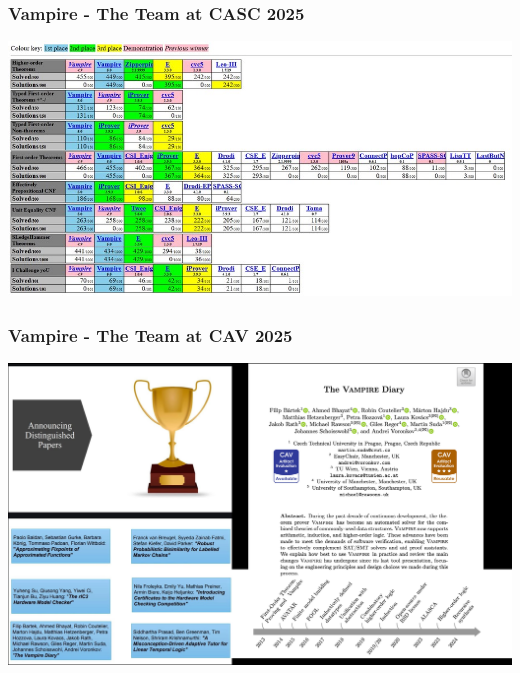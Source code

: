                       \begin{frame}
                 \frametitle{Vampire - The Team at CASC 2025}
\begin{center}
\includegraphics[scale=.5]{casc25.jpg}
\end{center}

\end{frame}
                 



                               
                                
                      \begin{frame}
                        \frametitle{Vampire - The Team at CAV 2025}

                        \begin{center}
                          \includegraphics[scale=.35]{Vampire_CAV25.jpg}
                          \end{center}

                        
                        \end{frame}



                             